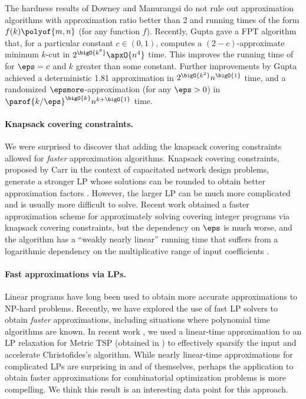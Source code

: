 \documentclass{toc}
\begin{document}
The hardness results of Downey \etal \cite{defpr-03} and Manurangsi
\cite{manurangsi-17} do not rule out approximation algorithms with
approximation ratio better than 2 and running times of the form
$f(k)\polyof{m,n}$ (for any function $f$). Recently, Gupta \etal \cite{gll-18} gave
a FPT algorithm that, for a particular constant $c \in (0,1)$,
computes a $(2 - c)$-approximate
minimum %
$k$-cut in
\begin{math}
  2^{\bigO{k^6}} \apxO{n^4}
\end{math}
time. This improves the running time of \cite{xcy-11} for $\eps = c$
and $k$ greater than some constant. Further improvements by
Gupta \etal \cite{gll-18-focs} achieved a deterministic 1.81 approximation in
$2^{\bigO{k^2}} n^{\bigO{1}}$ time, and a randomized
$\epsmore$-approximation (for any $\eps > 0$) in
$\parof{k / \eps}^{\bigO{k}} n^{k + \bigO{1}}$ time.

\paragraph{Knapsack covering constraints.}
We were surprised to discover that adding the knapsack covering
constraints allowed for \emph{faster} approximation
algorithms. Knapsack covering constraints, proposed by Carr \etal
\cite{cflp-00} in the context of capacitated network design problems,
generate a stronger LP whose solutions can be rounded to obtain better
approximation factors %
\cite{cflp-00,cckk-15,ky-05}.   %
However, the
larger LP can be much more complicated and is usually more difficult
to solve. Recent work obtained a faster approximation scheme for
%
approximately solving %
 covering integer programs via knapsack covering
constraints, but the dependency on $\eps$ is much worse, and the
algorithm has a ``weakly nearly linear'' running time that suffers
from a logarithmic dependency on the multiplicative range of input
coefficients \cite{cq-19}.

\paragraph{Fast approximations via LPs.}
Linear programs have long been used to obtain more accurate
approximations to %
NP-hard  %
problems. Recently, we have explored the use
of fast LP solvers to obtain \emph{faster} approximations, including
situations where polynomial time algorithms are known. In recent work
\cite{cq-18-christofides}, we used a %
linear-time  %
approximation to an
LP relaxation for Metric TSP (obtained in \cite{cq-17-focs}) to
effectively sparsify the input and accelerate
%
Christofides's
algorithm. While nearly %
linear-time  %
approximations for complicated
LPs are surprising in and of %
themselves, %
%
perhaps the application to
obtain faster approximations for combinatorial
optimization  %
problems is more
compelling. We think this result is %
%
%
an interesting %
data point for this approach.
\end{document}
